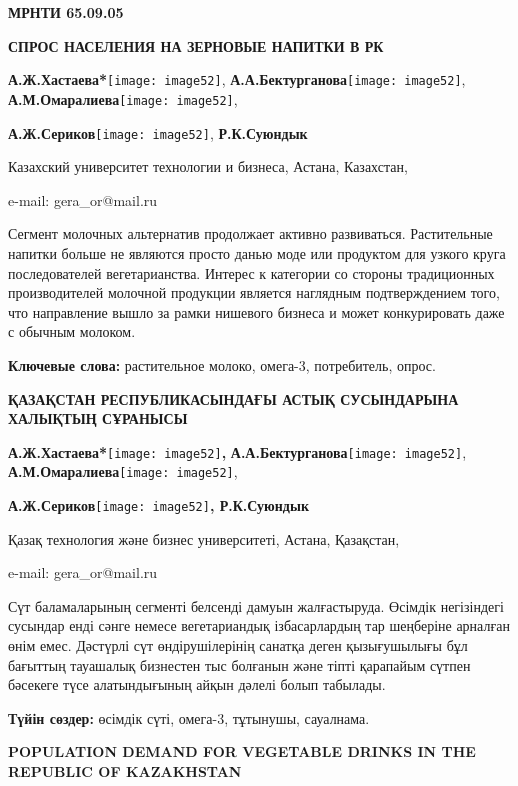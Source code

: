{\bfseries МРНТИ 65.09.05}

{\bfseries СПРОС НАСЕЛЕНИЯ НА ЗЕРНОВЫЕ НАПИТКИ В РК}

{\bfseries А.Ж.Хастаева*}\texttt{[image: image52]},
{\bfseries А.А.Бектурганова}\texttt{[image: image52]},
{\bfseries А.М.Омаралиева}\texttt{[image: image52]},

{\bfseries А.Ж.Сериков}\texttt{[image: image52]},
{\bfseries Р.К.Суюндык}

Казахский университет технологии и бизнеса, Астана, Казахстан,

e-mail: gera\_or@mail.ru

Сегмент молочных альтернатив продолжает активно развиваться.
Растительные напитки больше не являются просто данью моде или продуктом
для узкого круга последователей вегетарианства. Интерес к категории со
стороны традиционных производителей молочной продукции является
наглядным подтверждением того, что направление вышло за рамки нишевого
бизнеса и может конкурировать даже с обычным молоком.

{\bfseries Ключевые слова:} растительное молоко, омега-3, потребитель,
опрос.

{\bfseries ҚАЗАҚСТАН РЕСПУБЛИКАСЫНДАҒЫ АСТЫҚ СУСЫНДАРЫНА ХАЛЫҚТЫҢ СҰРАНЫСЫ}

{\bfseries А.Ж.Хастаева*}\texttt{[image: image52]}{\bfseries ,}
{\bfseries А.А.Бектурганова}\texttt{[image: image52]},
{\bfseries А.М.Омаралиева}\texttt{[image: image52]},

{\bfseries А.Ж.Сериков}\texttt{[image: image52]}{\bfseries ,
Р.К.Суюндык}

Қазақ технология және бизнес университеті, Астана, Қазақстан,

e-mail: gera\_or@mail.ru

Сүт баламаларының сегменті белсенді дамуын жалғастыруда. Өсімдік
негізіндегі сусындар енді сәнге немесе вегетариандық ізбасарлардың тар
шеңберіне арналған өнім емес. Дәстүрлі сүт өндірушілерінің санатқа деген
қызығушылығы бұл бағыттың тауашалық бизнестен тыс болғанын және тіпті
қарапайым сүтпен бәсекеге түсе алатындығының айқын дәлелі болып
табылады.

{\bfseries Түйін сөздер:} өсімдік сүті, омега-3, тұтынушы, сауалнама.

{\bfseries POPULATION DEMAND FOR VEGETABLE DRINKS IN THE REPUBLIC OF
KAZAKHSTAN}

